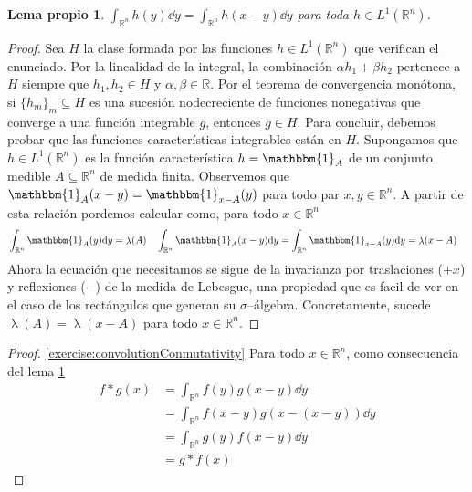 \documentclass{article}
\newcommand{\characteristic}{\mathbbm{1}}
\newcommand{\realNumbers}{\mathbb{R}}
\newcommand{\integrableFunctions}{L^1(\realNumbers^n)}
\newtheorem{myLemma}{Lema propio}
\DeclareMathOperator{\lebesgueMeasure}{\lambda}
\theoremstyle{remark}
\begin{document}
  \begin{myLemma}
    \label{myLemma:integralDomainReflection}
    \(
      \int_{\realNumbers^n} h(y) \dd y
      =
      \int_{\realNumbers^n} h(x - y) \dd y
    \)
    para toda \(h \in \integrableFunctions\).
  \end{myLemma}
  \begin{proof}
    Sea \(H\) la clase formada por las funciones \(h \in \integrableFunctions\) que verifican el enunciado.
    Por la linealidad de la integral, la combinación \(\alpha h_1 + \beta h_2\) pertenece a \(H\) siempre que \(h_1, h_2 \in H\) y \(\alpha, \beta \in \realNumbers\).
    Por el teorema de convergencia monótona, si \(\{h_m\}_m \subseteq H\) es una sucesión nodecreciente de funciones nonegativas que converge a una función integrable \(g\), entonces \(g \in H\).
    Para concluir, debemos probar que las funciones características integrables están en \(H\).
    Supongamos que \(h \in L^1(\realNumbers^n)\) es la función característica \(h = \characteristic_A\) de un conjunto medible \(A \subseteq \realNumbers^n\) de medida finita.
    Observemos que \(\characteristic_A (x - y) = \characteristic_{x - A} (y)\) para todo par \(x, y \in \realNumbers^n\).
    A partir de esta relación pordemos calcular como, para todo \(x \in \realNumbers^n\)
    \begin{align}
      &\int_{\realNumbers^n} \characteristic_A(y) \dd y
        =      
        \lebesgueMeasure(A)
      &&\int_{\realNumbers^n} \characteristic_A(x - y) \dd y
      =
      \int_{\realNumbers^n} \characteristic_{x - A}(y) \dd y
      =
      \lebesgueMeasure(x - A)
    \end{align}
    Ahora la ecuación que necesitamos se sigue de la invarianza por traslaciones (\(+ x\)) y reflexiones (\(-\)) de la medida de Lebesgue, una propiedad que es facil de ver en el caso de los rectángulos que generan su \(\sigma\)--álgebra.
    Concretamente, sucede
    \(
      \lebesgueMeasure(A)
      =
      \lebesgueMeasure(x - A)
    \)
    para todo \(x \in \realNumbers^n\).
  \end{proof}

  \begin{proof}
    \ref{exercise:convolutionConmutativity}
    Para todo \(x \in \realNumbers^n\), como consecuencia del lema \ref{myLemma:integralDomainReflection}
    \begin{align}
      f * g (x)
      &=
      \int_{\realNumbers^n} f(y) g(x - y) \dd y
      \\
      &=
      \int_{\realNumbers^n} f(x - y) g(x - (x - y)) \dd y
      \\
      &=
      \int_{\realNumbers^n} g(y) f(x - y) \dd y
      \\
      &=
      g * f (x)
    \end{align}
  \end{proof}
\end{document}
